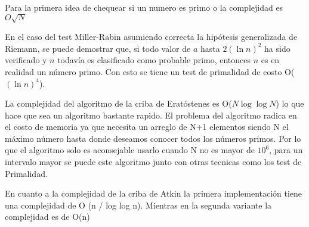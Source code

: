Para la primera idea de chequear si un numero es primo o la complejidad es $O\sqrt{N}$

En el caso del test Miller-Rabin asumiendo correcta la hipótesis generalizada de Riemann, se puede demostrar que, si todo valor de $a$ hasta $2(\ln n)^{2}$ ha sido verificado y $n$ todavía es clasificado como probable primo, entonces $n$ es en realidad un número primo. Con esto se tiene un test de primalidad de costo O($(\ln n)^{4}$).

La complejidad del algoritmo de la criba de Eratóstenes es O($N \log \log N$) lo que hace que sea un algoritmo bastante rapido. El problema del algoritmo radica en el costo de memoria ya que necesita un arreglo de N+1 elementos siendo N el máximo número hasta donde deseamos conocer todos los números primos. Por lo que el algoritmo solo es aconsejable usarlo cuando N no es mayor de $10^{6}$, para un intervalo mayor se puede este algoritmo junto con otras tecnicas como los test de Primalidad.

En cuanto a la complejidad de la criba de Atkin la primera implementación tiene una complejidad  de O (n / log log n). Mientras en la segunda variante la complejidad es de O(n)
